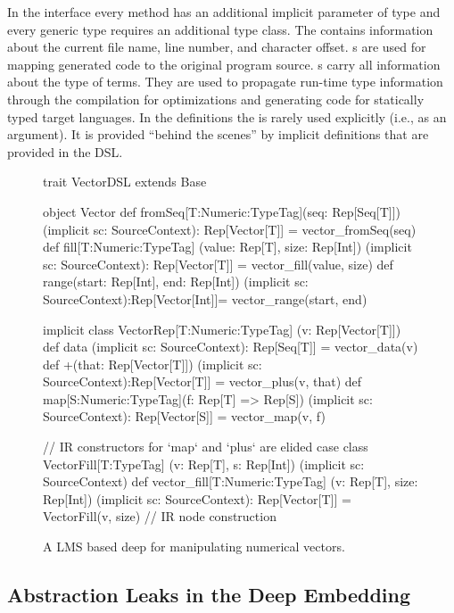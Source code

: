 In the  interface every method has an additional implicit
parameter of type  and every generic type requires an
additional  type class. The  contains information
about the current file name, line number, and character offset.
s are used for mapping generated code to the original
program source. s carry all information about the type of terms.
They are used to propagate run-time type information through the \edsl{}
compilation for optimizations and generating code for statically typed target
languages. In the \edsl definitions the  is rarely used
explicitly (i.e., as an argument). It is provided ``behind the scenes'' by implicit
definitions that are provided in the DSL.

\begin{figure}
\begin{listingtiny}
trait VectorDSL extends Base {
  object Vector {
    def fromSeq[T:Numeric:TypeTag](seq: Rep[Seq[T]])
      (implicit sc: SourceContext): Rep[Vector[T]] =
      vector_fromSeq(seq)
    def fill[T:Numeric:TypeTag]
      (value: Rep[T], size: Rep[Int])
      (implicit sc: SourceContext): Rep[Vector[T]] =
      vector_fill(value, size)
    def range(start: Rep[Int], end: Rep[Int])
      (implicit sc: SourceContext):Rep[Vector[Int]]=
      vector_range(start, end)
  }

  implicit class VectorRep[T:Numeric:TypeTag]
    (v: Rep[Vector[T]]) {
    def data
      (implicit sc: SourceContext): Rep[Seq[T]] =
      vector_data(v)
    def +(that: Rep[Vector[T]])
      (implicit sc: SourceContext):Rep[Vector[T]] =
      vector_plus(v, that)
    def map[S:Numeric:TypeTag](f: Rep[T] => Rep[S])
      (implicit sc: SourceContext): Rep[Vector[S]] =
      vector_map(v, f)
  }

  // IR constructors for `map` and `plus` are elided
  case class VectorFill[T:TypeTag]
    (v: Rep[T], s: Rep[Int])
    (implicit sc: SourceContext)
  def vector_fill[T:Numeric:TypeTag]
    (v: Rep[T], size: Rep[Int])
    (implicit sc: SourceContext): Rep[Vector[T]] =
    VectorFill(v, size) // IR node construction
}
\end{listingtiny}
\caption{\label{lst:vector_deep} A LMS based deep \edsl{} for manipulating numerical vectors.}
\end{figure}

\subsection{Abstraction Leaks in the Deep Embedding}
\label{sec:abstraction-leaks}


